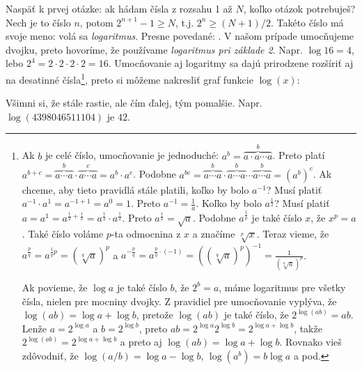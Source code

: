 \documentclass[10pt]{article}
\def\ods{\vspace*{10pt}}
\begin{document}
\ods
Naspäť k prvej otázke: ak hádam čísla z rozsahu 1 až $N$, koľko otázok potrebuješ? Nech
je to číslo $n$, potom $2^{n+1}-1\ge N$, t.j. $2^n\ge(N+1)/2$. Takéto číslo má svoje meno:
volá sa {\em logaritmus}. Presne povedané: . V našom prípade umocňujeme dvojku, preto hovoríme, že používame 
{\em logaritmus pri základe 2}. Napr. $\log16=4$, lebo $2^4=2\cdot2\cdot2\cdot2=16$. 
Umocňovanie aj logaritmy sa dajú prirodzene rozšíriť aj na desatinné čísla\footnote{%
  Ak $b$ je celé číslo, umocňovanie je jednoduché: 
  $a^b=\overbrace{a\cdot a\cdots a}^b$. Preto platí 
  $a^{b+c}=\overbrace{a\cdots a}^b\cdot\overbrace{a\cdots a}^c=a^b\cdot a^c$.
  Podobne $a^{bc}=
  \overbrace{a\cdots a}^b\cdot
  \overbrace{a\cdots a}^b
  \cdots\overbrace{a\cdots a}^b=(a^b)^c$. Ak chceme,
  aby tieto pravidlá stále platili, koľko by bolo $a^{-1}$? Musí platiť
  $a^{-1}\cdot a^1=a^{-1+1}=a^0=1$. Preto $a^{-1}=\frac{1}{a}$.
  Koľko by bolo $a^\frac{1}{2}$? Musí platiť
  $a=a^1=a^{\frac{1}{2}+\frac{1}{2}}=a^\frac{1}{2}\cdot a^\frac{1}{2}$. Preto 
  $a^\frac{1}{2}=\sqrt{a}$. Podobne $a^\frac{1}{p}$ je také číslo $x$, že $x^p=a$.
  Také číslo voláme $p$-ta odmocnina z $x$ a značíme $\sqrt[p]{x}$.
  Teraz vieme, že $a^\frac{p}{q}=a^{\frac{1}{q}p}=(\sqrt[q]{a})^p$ a 
  $a^{-\frac{p}{q}}=a^{\frac{p}{q}\cdot(-1)}=((\sqrt[q]{a})^p)^{-1}=\frac{1}{(\sqrt[q]{a})^p}$.

  Ak povieme, že $\log a$ je také číslo $b$, že $2^b=a$, máme logaritmus pre všetky čísla,
  nielen pre mocniny dvojky. Z pravidiel pre umocňovanie vyplýva, že 
  $\log(ab)=\log a+\log b$, pretože $\log(ab)$ je také číslo, že $2^{\log(ab)}=ab$.
  Lenže $a=2^{\log a}$ a $b=2^{\log b}$, preto $ab=2^{\log a}2^{\log b}=2^{\log a+\log b}$,
  takže $2^{\log(ab)}=2^{\log a+\log b}$ a preto aj $\log(ab)=\log a+\log b$.
  Rovnako vieš zdôvodniť, že $\log(a/b)=\log a-\log b$, $\log(a^b)=b\log a$ a pod.
}, preto si môžeme nakresliť graf funkcie $\log(x)$:

\ods
{}

Všimni si, že stále rastie, ale čím ďalej, tým pomalšie.
Napr. $\log(4398046511104)$ je $42$.
\end{document}
